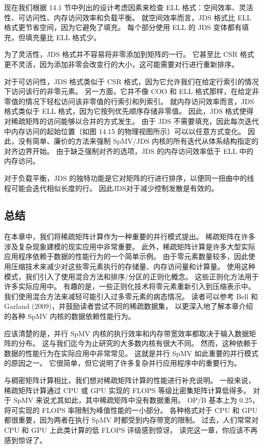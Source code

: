 现在我们根据 14.1 节中列出的设计考虑因素来检查 ELL 格式：空间效率、灵活性、可访问性、内存访问效率和负载平衡。 
就空间效率而言，JDS 格式比 ELL 格式更节省空间，因为它避免了填充。 
每个部分使用 ELL 的 JDS 变体都有填充，但填充量比 ELL 格式少。

为了灵活性，JDS 格式并不容易将非零添加到矩阵的一行。 
它甚至比 CSR 格式更不灵活，因为添加非零会改变行的大小，这可能需要对行进行重新排序。

对于可访问性，JDS 格式类似于 CSR 格式，因为它允许我们在给定行索引的情况下访问该行的非零元素。 
另一方面，它并不像 COO 和 ELL 格式那样，在给定非零值的情况下轻松访问该非零值的行索引和列索引。 
就内存访问效率而言，JDS 格式类似于 ELL 格式，因为它按列优先顺序存储非零值。 
因此，JDS 格式使得对稀疏矩阵的访问能够以合并的方式发生。 
由于 JDS 不需要填充，因此每次迭代中内存访问的起始位置（如图 14.15 的物理视图所示）可以以任意方式变化。 
因此，没有简单、廉价的方法来强制 SpMV/JDS 内核的所有迭代从体系结构指定的对齐边界开始。 
由于缺乏强制对齐的选项，JDS 的内存访问效率低于 ELL 中的内存访问。

对于负载平衡，JDS 的独特功能是它对矩阵的行进行排序，以便同一扭曲中的线程可能会迭代相似长度的行。 
因此JDS对于减少控制发散是有效的。

\subsection{总结}
在本章中，我们将稀疏矩阵计算作为一种重要的并行模式提出。 稀疏矩阵在许多涉及复杂现象建模的现实应用中非常重要。 
此外，稀疏矩阵计算是许多大型实际应用程序依赖于数据的性能行为的一个简单示例。 
由于零元素数量较多，因此使用压缩技术来减少对这些零元素执行的存储量、内存访问量和计算量。 
使用这种模式，我们引入了使用混合方法和排序/分区的正则化概念。 这些正则化方法用于许多实际应用中。 
有趣的是，一些正则化技术将零元素重新引入到压缩表示中。 我们使用混合方法来减轻可能引入过多零元素的病态情况。 
读者可以参考 Bell 和 Garland (2009)，并鼓励读者尝试不同的稀疏数据集，
以更深入地了解本章介绍的各种 SpMV 内核的数据依赖性能行为。

应该清楚的是，并行 SpMV 内核的执行效率和内存带宽效率都取决于输入数据矩阵的分布。 
这与我们迄今为止研究的大多数内核有很大不同。 然而，这种依赖于数据的性能行为在实际应用中非常常见。 
这就是并行 SpMV 如此重要的并行模式的原因之一。 它很简单，但它说明了许多复杂并行应用程序中的重要行为。

与稠密矩阵计算相比，我们想对稀疏矩阵计算的性能进行补充说明。 
一般来说，稀疏矩阵计算通过 CPU 或 GPU 实现的 FLOPS 等级比密集矩阵计算低得多。 
对于 SpMV 来说尤其如此，其中稀疏矩阵中没有数据重用。 OP/B 基本上为 0.25，将可实现的 FLOPS 率限制为峰值性能的一小部分。 
各种格式对于 CPU 和 GPU 都很重要，因为两者在执行 SpMV 时都受到内存带宽的限制。 
过去，人们常常对 CPU 和 GPU 上此类计算的低 FLOPS 评级感到惊讶。 读完这一章，你应该不再感到惊讶了。